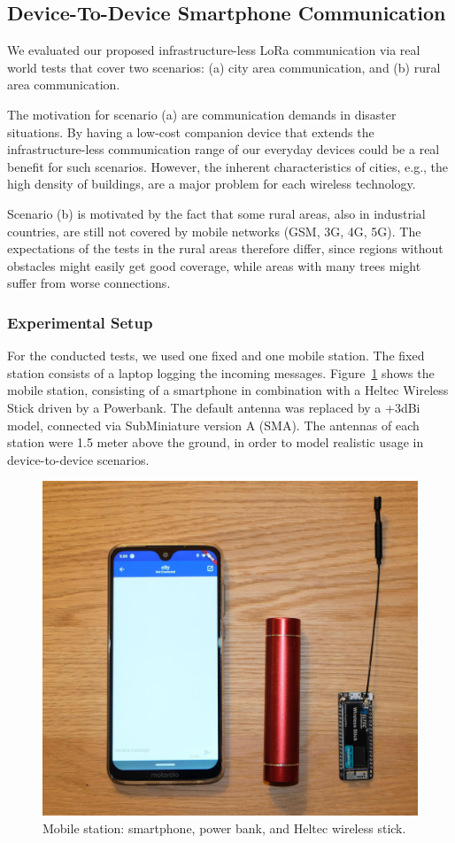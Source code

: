 \subsection{Device-To-Device Smartphone Communication}
We evaluated our proposed infrastructure-less LoRa communication via real world tests that cover two scenarios: (a) city area communication, and (b) rural area communication.

The motivation for scenario (a) are communication demands in disaster situations.
By having a low-cost companion device that extends the infrastructure-less communication range of our everyday devices could be a real benefit for such scenarios.
However, the inherent characteristics of cities, e.g., the high density of buildings, are a major problem for each wireless technology.

Scenario (b) is motivated by the fact that some rural areas, also in industrial countries, are still not covered by mobile networks (GSM, 3G, 4G, 5G).
The expectations of the tests in the rural areas therefore differ, since regions without obstacles might easily get good coverage, while areas with many trees might suffer from worse connections.

\subsubsection{Experimental Setup}

For the conducted tests, we used one fixed and one mobile station. 
The fixed station consists of a laptop logging the incoming messages. 
Figure~\ref{fig:evalsetup1} shows the mobile station, consisting of a smartphone in combination with a Heltec Wireless Stick driven by a Powerbank.
The default antenna was replaced by a +3dBi model, connected via SubMiniature version A (SMA).
The antennas of each station were 1.5 meter above the ground, in order to model realistic usage in device-to-device scenarios.

\begin{figure}[ht!]
    \centering
    \includegraphics[width=.7\textwidth]{gfx/bluera-package.jpg}
    \caption{Mobile station: smartphone, power bank, and Heltec wireless stick.}
    \label{fig:evalsetup1}
\end{figure}

